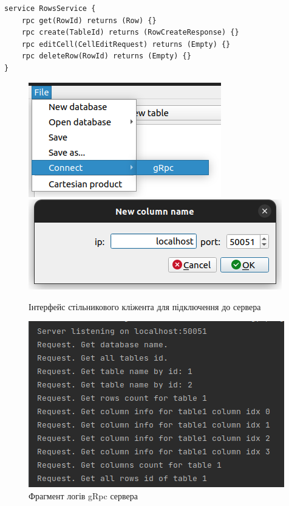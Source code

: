 \documentclass[a4paper, 12pt]{article}
\begin{document}
\begin{lstlisting}[caption=код gRpc сервіса для отриманя рядка таблиці]
service RowsService {
    rpc get(RowId) returns (Row) {}
    rpc create(TableId) returns (RowCreateResponse) {}
    rpc editCell(CellEditRequest) returns (Empty) {}
    rpc deleteRow(RowId) returns (Empty) {}
}
\end{lstlisting}

\begin{figure}[H]
\centering
\includegraphics[scale=0.5]{resources/gRpcClientMenu.png}
\includegraphics[scale=0.5]{resources/gRpcClientDialog.png}
\caption{Інтерфейс стільникового кліжента для підключення до сервера}
\end{figure}

\begin{figure}[H]
\centering
\includegraphics[scale=0.5]{resources/gRpcServerLogs.png}
\caption{Фрагмент логів gRpc сервера}
\end{figure}
\end{document}
